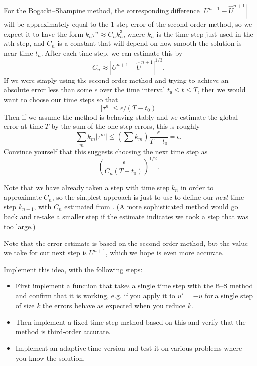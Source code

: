 \documentclass[10pt]{article}
\begin{document}
For the Bogacki--Shampine method, the corresponding difference $|U^{n+1}-\hat
U^{n+1}|$ will be approximately equal to the 1-step error of the second order
method, so we expect it to have the form $k_n\tau^n \approx C_n k_n^3$, where
$k_n$ is the time
step just used in the $n$th step, and $C_n$ is a constant that will depend
on how smooth the solution is near time $t_n$.  After each time step, we
can estimate this by
\begin{equation}\label{Cn}
C_n \approx |U^{n+1}-\hat U^{n+1}|^{1/3}.
\end{equation} 
If we were simply using the second order method and trying to achieve an
absolute error less than some $\epsilon$ over the time interval $t_0 \leq t
\leq T$, then we would want to choose our time steps so that 
\[
|\tau^n| \leq \epsilon / (T-t_0)
\]
Then if we assume the method is behaving stably and we estimate the global
error at time $T$ by the sum of the one-step errors, this is roughly
\[
\sum_m k_m |\tau^m| \leq \left(\sum k_m\right) \frac{\epsilon}{T-t_0} =
\epsilon.
\]
Convince yourself that this suggests choosing the next time step as
\begin{equation}\label{kn}
\left(\frac{\epsilon}{C_n(T-t_0)}\right)^{1/2}.
\end{equation} 

Note that we have already taken a step with time step $k_n$ in order to
approximate $C_n$, so the simplest approach is just to use 
to define our {\em next} time step $k_{n+1}$, with $C_n$ estimated
from .  (A more sophisticated method would go back and
re-take a smaller step if the estimate indicates we took a step
that was too large.)

Note that the error estimate is based on the second-order method, but the
value we take for our next step is $U^{n+1}$, which we hope is even more
accurate.

\newpage
Implement this idea, with the following steps:

\begin{itemize} 
\item First implement a function that takes a single time step with the B--S
method and confirm that it is working, e.g. if you apply it to $u' = -u$
for a single step of size $k$ the errors behave as expected when you reduce
$k$.  

\item Then implement a fixed time step method based on this and verify that
the method is third-order accurate.

\item Implement an adaptive time version and test it on various 
problems where you know the solution.

\end{itemize} 
\end{document}
